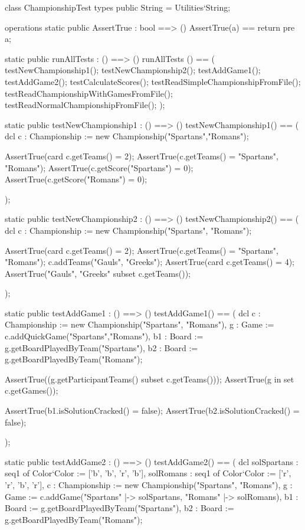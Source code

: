 \begin{vdm_al}
class ChampionshipTest
 types
  public String = Utilities`String;

 operations
 static public AssertTrue : bool ==> ()
  AssertTrue(a) == return
 pre a;


 static public runAllTests : () ==> ()
 runAllTests () == (
  testNewChampionship1();
  testNewChampionship2();
  testAddGame1();
  testAddGame2();
  testCalculateScores();
  testReadSimpleChampionshipFromFile();
  testReadChampionshipWithGamesFromFile();
  testReadNormalChampionshipFromFile();
 );


 static public testNewChampionship1 : () ==> ()
 testNewChampionship1() ==
  ( dcl c : Championship := new Championship({"Spartans","Romans"});

   AssertTrue(card c.getTeams() = 2);
   AssertTrue(c.getTeams() = {"Spartans", "Romans"});
   AssertTrue(c.getScore("Spartans") = 0);
   AssertTrue(c.getScore("Romans") = 0);

  );


 static public testNewChampionship2 : () ==> ()
 testNewChampionship2() ==
  ( dcl c : Championship := new Championship({"Spartans", "Romans"});

   AssertTrue(card c.getTeams() = 2);
   AssertTrue(c.getTeams() = {"Spartans", "Romans"});
   c.addTeams({"Gauls", "Greeks"});
   AssertTrue(card c.getTeams() = 4);
   AssertTrue({"Gauls", "Greeks"} subset c.getTeams());

  );


 static public testAddGame1 : () ==> ()
 testAddGame1() ==
  ( dcl c : Championship := new Championship({"Spartans", "Romans"}),
   g  : Game  := c.addQuickGame("Spartans","Romans"),
   b1 : Board := g.getBoardPlayedByTeam("Spartans"),
   b2 : Board := g.getBoardPlayedByTeam("Romans");

   AssertTrue((g.getParticipantTeams() subset c.getTeams()));
   AssertTrue(g in set c.getGames());

   AssertTrue(b1.isSolutionCracked() = false);
   AssertTrue(b2.isSolutionCracked() = false);

  );


 static public testAddGame2 : () ==> ()
 testAddGame2() ==
  ( dcl solSpartans : seq1 of Color`Color := ['b', 'b', 'r', 'b'],
   solRomans : seq1 of Color`Color := ['r', 'r', 'b', 'r'],
   c : Championship := new Championship({"Spartans", "Romans"}),
   g : Game := c.addGame({"Spartans" |-> solSpartans, "Romans" |-> solRomans}),
   b1 : Board := g.getBoardPlayedByTeam("Spartans"),
   b2 : Board := g.getBoardPlayedByTeam("Romans");


\end{vdm_al}
